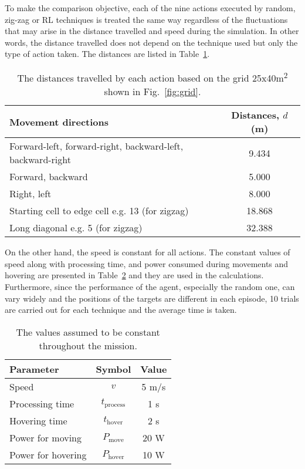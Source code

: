 \documentclass[../main.tex]{subfiles}
\begin{document}
To make the comparison objective, 
each of the nine actions executed by random, zig-zag
or RL techniques is treated the same way regardless 
of the fluctuations that may arise in the 
distance travelled and speed during
the simulation.
In other words, the distance travelled does not depend
on the technique used but only 
the type of action taken. 
The distances are listed in Table~\ref{tab:distances}.

\begin{table}[!t]
\caption{The distances travelled by each action based on
    the grid 25x40m\textsuperscript{2} shown in 
    Fig.~\ref{fig:grid}.}
\label{tab:distances}
\centering
\begin{tabular}{|p{1.4in}|c|}
\hline
Movement directions & Distances, $d$ (m) \\
\hline
\raggedright Forward-left, forward-right, 
backward-left, backward-right & 9.434 \\
Forward, backward & 5.000 \\
Right, left & 8.000 \\
Starting cell to edge cell e.g. 13\textrightarrow 1 (for zigzag) & 18.868 \\
\raggedright Long diagonal e.g. 5\textrightarrow 6 (for zigzag) & 32.388 \\
\hline
\end{tabular}
\end{table}

On the other hand, the speed is constant for all actions. 
The constant values of speed along with processing time,
and power consumed during movements and hovering
are presented
in Table~\ref{tab:assumptions}
and they are used in the calculations.
Furthermore, since the performance of the agent,
especially the random one, can vary widely and
the positions of the targets are different in each episode, 
10 trials are carried out for each technique and
the average time is taken.

\begin{table}[!t]
\caption{The values assumed to be constant throughout the
mission.}
\label{tab:assumptions}
\centering
\begin{tabular}{|l|c|c|}
\hline
Parameter & Symbol & Value \\
\hline
Speed & $v$ & 5 m/s \\
Processing time & $t_{\text{process}}$ & 1 s \\
Hovering time & $t_{\text{hover}}$ & 2 s \\
Power for moving & $P_{\text{move}}$ & 20 W \\
Power for hovering & $P_{\text{hover}}$ & 10 W \\
\hline
\end{tabular}
\end{table}
\end{document}
